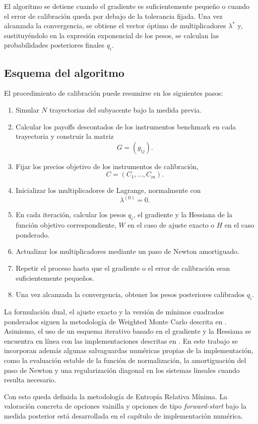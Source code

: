 El algoritmo se detiene cuando el gradiente es suficientemente pequeño o cuando el error de calibración queda por debajo de la tolerancia fijada. Una vez alcanzada la convergencia, se obtiene el vector óptimo de multiplicadores \(\lambda^*\) y, sustituyéndolo en la expresión exponencial de los pesos, se calculan las probabilidades posteriores finales \(q_i\).


\subsection{Esquema del algoritmo}

El procedimiento de calibración puede resumirse en los siguientes pasos:

\begin{enumerate}
    \item Simular \(N\) trayectorias del subyacente bajo la medida previa.

    \item Calcular los payoffs descontados de los instrumentos benchmark en cada trayectoria y construir la matriz
    \[
    G=(g_{ij}).
    \]

    \item Fijar los precios objetivo de los instrumentos de calibración,
    \[
    C=(C_1,\ldots,C_m).
    \]

    \item Inicializar los multiplicadores de Lagrange, normalmente con
    \[
    \lambda^{(0)}=0.
    \]

    \item En cada iteración, calcular los pesos \(q_i\), el gradiente y la Hessiana de la función objetivo correspondiente, \(W\) en el caso de ajuste exacto o \(H\) en el caso ponderado.

    \item Actualizar los multiplicadores mediante un paso de Newton amortiguado.

    \item Repetir el proceso hasta que el gradiente o el error de calibración sean suficientemente pequeños.

    \item Una vez alcanzada la convergencia, obtener los pesos posteriores calibrados \(q_i\).
\end{enumerate}

La formulación dual, el ajuste exacto y la versión de mínimos cuadrados ponderados siguen la metodología de Weighted Monte Carlo descrita en \cite{articleAvellaneda}. Asimismo, el uso de un esquema iterativo basado en el gradiente y la Hessiana se encuentra en línea con las implementaciones descritas en \cite{articleElices}. En este trabajo se incorporan además algunas salvaguardas numéricas propias de la implementación, como la evaluación estable de la función de normalización, la amortiguación del paso de Newton y una regularización diagonal en los sistemas lineales cuando resulta necesario.\medskip

Con esto queda definida la metodología de Entropía Relativa Mínima. La valoración concreta de opciones vainilla y opciones de tipo \textit{forward-start} bajo la medida posterior está desarrollada en el capítulo de implementación numérica.
